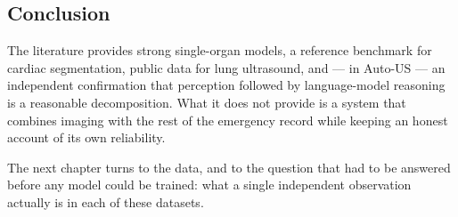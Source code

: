 \subsection{Conclusion}

The literature provides strong single-organ models, a reference benchmark for cardiac
segmentation, public data for lung ultrasound, and --- in Auto-US --- an independent
confirmation that perception followed by language-model reasoning is a reasonable
decomposition. What it does not provide is a system that combines imaging with the rest of
the emergency record while keeping an honest account of its own reliability.

The next chapter turns to the data, and to the question that had to be answered before any
model could be trained: what a single independent observation actually is in each of these
datasets.
